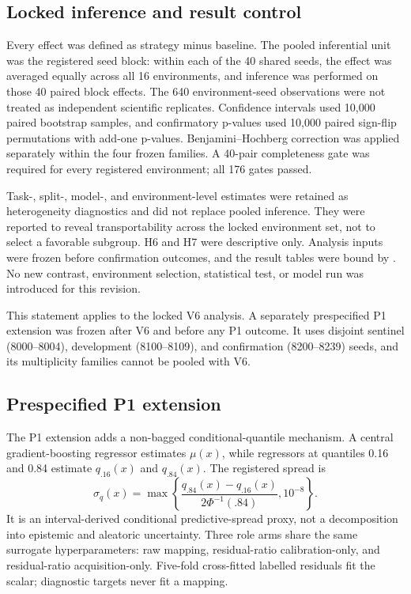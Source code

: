 \documentclass[10pt]{article}
\begin{document}
\subsection{Locked inference and result control}
Every effect was defined as strategy minus baseline. The pooled inferential
unit was the registered seed block: within each of the 40 shared seeds, the
effect was averaged equally across all 16 environments, and inference was
performed on those 40 paired block effects. The 640 environment-seed
observations were not treated as independent scientific replicates.
Confidence intervals used 10,000 paired bootstrap samples, and confirmatory
p-values used 10,000 paired sign-flip permutations with add-one p-values.
Benjamini--Hochberg correction was applied separately within the four frozen
families. A 40-pair completeness gate was required for every registered
environment; all 176 gates passed.

Task-, split-, model-, and environment-level estimates were retained as
heterogeneity diagnostics and did not replace pooled inference. They were
reported to reveal transportability across the locked environment set, not to
select a favorable subgroup. H6 and H7 were descriptive only. Analysis inputs
were frozen before confirmation outcomes, and the result tables were bound by
. No new
contrast, environment selection, statistical test, or model run was
introduced for this revision.

This statement applies to the locked V6 analysis. A separately prespecified
P1 extension was frozen after V6 and before any P1 outcome. It uses disjoint
sentinel (8000--8004), development (8100--8109), and confirmation
(8200--8239) seeds, and its multiplicity families cannot be pooled with V6.

\subsection{Prespecified P1 extension}
The P1 extension adds a non-bagged conditional-quantile mechanism. A central
gradient-boosting regressor estimates $\mu(x)$, while regressors at quantiles
0.16 and 0.84 estimate $q_{.16}(x)$ and $q_{.84}(x)$. The registered spread is
\begin{equation}
 \sigma_q(x)=\max\left\{\frac{q_{.84}(x)-q_{.16}(x)}
 {2\Phi^{-1}(.84)},10^{-8}\right\}.
\end{equation}
It is an interval-derived conditional predictive-spread proxy, not a
decomposition into epistemic and aleatoric uncertainty. Three role arms share
the same surrogate hyperparameters: raw mapping, residual-ratio
calibration-only, and residual-ratio acquisition-only. Five-fold cross-fitted
labelled residuals fit the scalar; diagnostic targets never fit a mapping.
\end{document}

